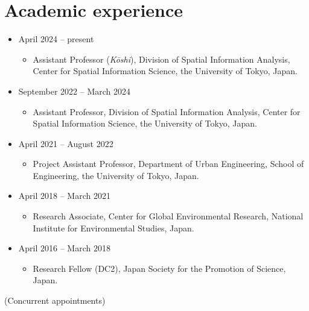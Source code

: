 \documentclass[
]{book}
\providecommand{\tightlist}{%
  \setlength{\itemsep}{0pt}\setlength{\parskip}{0pt}}
\begin{document}
\section*{Academic experience}\label{academic-experience}

\begin{itemize}
\tightlist
\item
  April 2024 -- present

  \begin{itemize}
  \tightlist
  \item
    Assistant Professor (\emph{Kōshi}),
    Division of Spatial Information Analysis, Center for Spatial Information Science, the University of Tokyo, Japan.
  \end{itemize}
\item
  September 2022 -- March 2024

  \begin{itemize}
  \tightlist
  \item
    Assistant Professor,
    Division of Spatial Information Analysis, Center for Spatial Information Science, the University of Tokyo, Japan.
  \end{itemize}
\item
  April 2021 -- August 2022

  \begin{itemize}
  \tightlist
  \item
    Project Assistant Professor,
    Department of Urban Engineering, School of Engineering, the University of Tokyo, Japan.
  \end{itemize}
\item
  April 2018 -- March 2021

  \begin{itemize}
  \tightlist
  \item
    Research Associate,
    Center for Global Environmental Research, National Institute for Environmental Studies, Japan.
  \end{itemize}
\item
  April 2016 -- March 2018

  \begin{itemize}
  \tightlist
  \item
    Research Fellow (DC2),
    Japan Society for the Promotion of Science, Japan.
  \end{itemize}
\end{itemize}

(Concurrent appointments)
\end{document}

